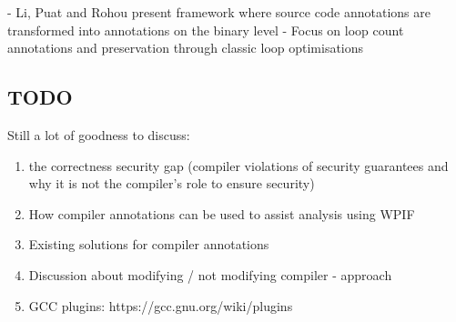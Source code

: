\documentclass[twocolumn]{article}
\begin{document}
- Li, Puat and Rohou present framework where source code annotations are transformed into annotations on the binary level
- Focus on loop count annotations and preservation through classic loop optimisations


\subsection{TODO}
Still a lot of goodness to discuss:
\begin{enumerate}
    \item the correctness security gap (compiler violations of security guarantees and why it is not the compiler's role to ensure security)
    \item How compiler annotations can be used to assist analysis using WPIF
    \item Existing solutions for compiler annotations
    \item Discussion about modifying / not modifying compiler - approach
    \item GCC plugins: https://gcc.gnu.org/wiki/plugins
\end{enumerate}






\printbibliography
\end{document}
